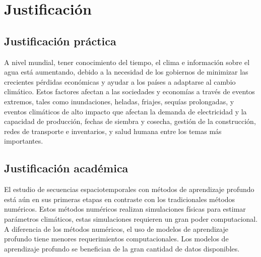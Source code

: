\section{Justificación}
\subsection{Justificación práctica}
	
A nivel mundial, tener conocimiento del tiempo, el clima e información sobre el
agua está aumentando, debido a la necesidad de los gobiernos de minimizar las
crecientes pérdidas económicas y ayudar a los países a adaptarse al cambio
climático. Estos factores afectan a las sociedades y economías a través de 
eventos extremos, tales como inundaciones, heladas, friajes, sequías 
prolongadas, y eventos climáticos de alto impacto que afectan la demanda de 
electricidad y la capacidad de producción, fechas de siembra y cosecha, gestión 
de la construcción, redes de transporte e inventarios, y salud humana entre los 
temas más importantes.
	
\subsection{Justificación académica}

El estudio de secuencias espaciotemporales con métodos de aprendizaje profundo 
está aún en sus primeras etapas en contraste con los tradicionales métodos 
numéricos. Estos métodos numéricos realizan simulaciones físicas para estimar
parámetros climáticos, estas simulaciones requieren un gran poder computacional.
A diferencia de los métodos numéricos, el uso de modelos de aprendizaje 
profundo tiene menores requerimientos computacionales. Los modelos de 
aprendizaje profundo se benefician de la gran cantidad de datos disponibles.




